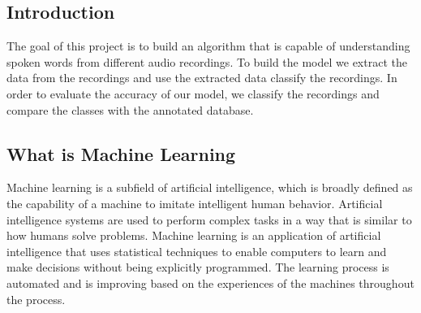 \documentclass[english,12pt,oneside,a4paper]{article}
\begin{document}
\begin{center}
		\section{Introduction}
		The goal of this project is to build an algorithm that is capable of understanding spoken words from different audio recordings. To build the model we extract the data from the recordings and use the extracted data classify the recordings. In order to evaluate the  accuracy of our model, we classify the recordings and compare the classes with the annotated database.
		\subsection{What is Machine Learning}
		Machine learning is a subfield of artificial intelligence, which is broadly defined as the capability of a machine to imitate intelligent human behavior. Artificial intelligence systems are used to perform complex tasks in a way that is similar to how humans solve problems.
		Machine learning is an application of artificial intelligence that uses statistical techniques to enable computers to learn and make decisions without being explicitly programmed. The learning process is automated and is improving based on the experiences of the machines throughout the process.

\end{center}
\end{document}
